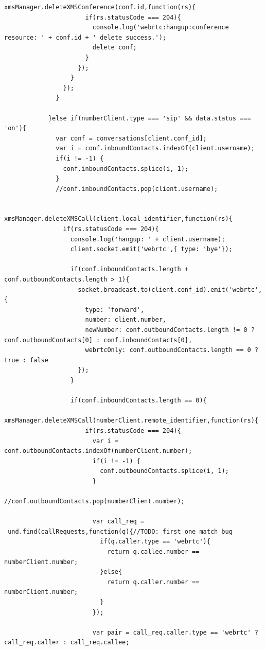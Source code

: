 \begin{appendices}
\begin{lstlisting}[caption={socket.js on Application Server},label={code:server_socket}]
                    xmsManager.deleteXMSConference(conf.id,function(rs){
                      if(rs.statusCode === 204){
                        console.log('webrtc:hangup:conference resource: ' + conf.id + ' delete success.');
                        delete conf;
                      }
                    });
                  }
                });
              }

            }else if(numberClient.type === 'sip' && data.status === 'on'){
              var conf = conversations[client.conf_id];
              var i = conf.inboundContacts.indexOf(client.username);
              if(i != -1) {
                conf.inboundContacts.splice(i, 1);
              }
              //conf.inboundContacts.pop(client.username);

              xmsManager.deleteXMSCall(client.local_identifier,function(rs){
                if(rs.statusCode === 204){
                  console.log('hangup: ' + client.username);
                  client.socket.emit('webrtc',{ type: 'bye'});

                  if(conf.inboundContacts.length + conf.outboundContacts.length > 1){
                    socket.broadcast.to(client.conf_id).emit('webrtc',{
                      type: 'forward',
                      number: client.number,
                      newNumber: conf.outboundContacts.length != 0 ? conf.outboundContacts[0] : conf.inboundContacts[0],
                      webrtcOnly: conf.outboundContacts.length == 0 ? true : false
                    });
                  }

                  if(conf.inboundContacts.length == 0){
                    xmsManager.deleteXMSCall(numberClient.remote_identifier,function(rs){
                      if(rs.statusCode === 204){
                        var i = conf.outboundContacts.indexOf(numberClient.number);
                        if(i != -1) {
                          conf.outboundContacts.splice(i, 1);
                        }
                        //conf.outboundContacts.pop(numberClient.number);

                        var call_req = _und.find(callRequests,function(q){//TODO: first one match bug
                          if(q.caller.type == 'webrtc'){
                            return q.callee.number == numberClient.number;
                          }else{
                            return q.caller.number == numberClient.number;
                          }
                        });

                        var pair = call_req.caller.type == 'webrtc' ? call_req.caller : call_req.callee;


\end{lstlisting}
\end{appendices}
